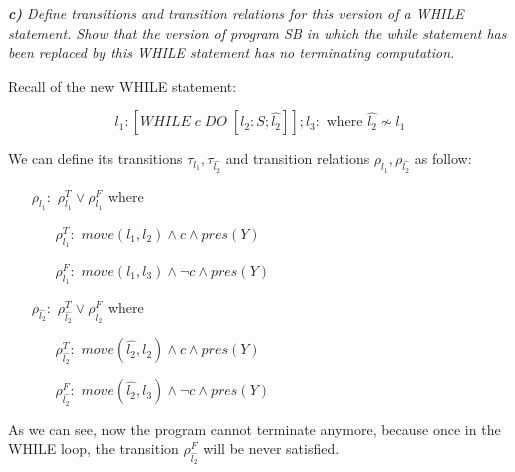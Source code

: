 \documentclass[12pt]{article}
\begin{document}
\medskip
\textit{\textbf{c)} Define transitions and transition relations for this version of a WHILE statement.
Show that the version of program SB in which the while statement has been replaced by this WHILE statement has no terminating computation.}

Recall of the new WHILE statement:

$$ l_1: [WHILE\;c\;DO\;[l_2:S;\hat{l_2}]]; l_3: \textrm{ where } \hat{l_2} \nsim l_1$$

We can define its transitions $\tau_{l_1},\tau_{\hat{l_2}}$ and transition relations $\rho_{l_1},\rho_{\hat{l_2}}$ as follow:

\begin{itemize}
\item[$\rho_{l_1}:$] $\rho^T_{l_1} \lor \rho^F_{l_1}$ where 
	\begin{itemize}
		\item[$\rho^T_{l_1}:$] $move(l_1,l_2) \land c \land pres(Y)$ 
		\item[$\rho^F_{l_1}:$] $move(l_1,l_3) \land \neg c \land pres(Y)$
	\end{itemize}
\item[$\rho_{\hat{l_2}}:$] $\rho^T_{\hat{l_2}} \lor \rho^F_{\hat{l_2}}$ where 
	\begin{itemize}
		\item[$\rho^T_{\hat{l_2}}:$] $move(\hat{l_2},l_2) \land c \land pres(Y)$ 
		\item[$\rho^F_{\hat{l_2}}:$] $move(\hat{l_2},l_3) \land \neg c \land pres(Y)$
	\end{itemize}
\end{itemize}

As we can see, now the program cannot terminate anymore, because once in the WHILE loop, the transition $\rho^F_{\hat{l_2}}$ will be never satisfied.
\end{document}
